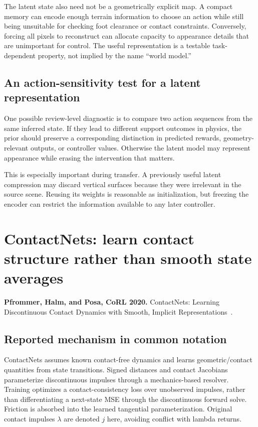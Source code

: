 The latent state also need not be a geometrically explicit map. A compact memory
can encode enough terrain information to choose an action while still being
unsuitable for checking foot clearance or contact constraints. Conversely,
forcing all pixels to reconstruct can allocate capacity to appearance details
that are unimportant for control. The useful representation is a testable
task-dependent property, not implied by the name ``world model.''

\subsection{An action-sensitivity test for a latent representation}
One possible review-level diagnostic is to compare two action sequences from
the same inferred state. If they lead to different support outcomes in physics,
the prior should preserve a corresponding distinction in predicted rewards,
geometry-relevant outputs, or controller values. Otherwise the latent model may
represent appearance while erasing the intervention that matters.

This is especially important during transfer. A previously useful latent
compression may discard vertical surfaces because they were irrelevant in the
source scene. Reusing its weights is reasonable as initialization, but freezing
the encoder can restrict the information available to any later controller.

\section{ContactNets: learn contact structure rather than smooth state averages}\label{sec:contactnets}
\textbf{Pfrommer, Halm, and Posa, CoRL 2020.} ContactNets: Learning
Discontinuous Contact Dynamics with Smooth, Implicit Representations~\cite{contactnets}.

\subsection{Reported mechanism in common notation}
ContactNets assumes known contact-free dynamics and learns geometric/contact
quantities from state transitions. Signed distances and contact Jacobians
parameterize discontinuous impulses through a mechanics-based resolver.
Training optimizes a contact-consistency loss over unobserved impulses, rather
than differentiating a next-state MSE through the discontinuous forward solve.
Friction is absorbed into the learned tangential parameterization. Original
contact impulses $\lambda$ are denoted $j$ here, avoiding conflict with lambda returns.

